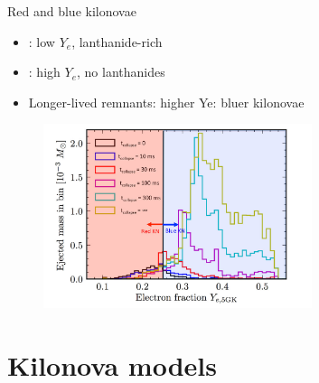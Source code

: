 \documentclass[usenames,dvipsnames,t]{beamer}
\begin{document}
\begin{frame}{Red and blue kilonovae}

  \begin{itemize}
    \item {}: low $Y_e$, lanthanide-rich
    
    \vspace{3mm}
    
    \item {}: high $Y_e$, no lanthanides
    
    \vspace{3mm}

    \item Longer-lived remnants: higher Ye: bluer kilonovae
  \end{itemize}
  
  \begin{figure}
    \centering
    \includegraphics[width=0.7\textwidth]{Figures/lifetime_remnant_and_blue_red_KN.png}
  \end{figure}

\end{frame}

\section{Kilonova models}
\end{document}
